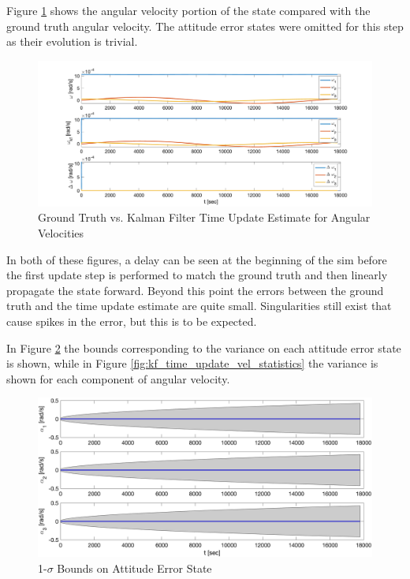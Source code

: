Figure \ref{fig:kf_omega_prop} shows the angular velocity portion of the state compared with the ground truth angular velocity. The attitude error states were omitted for this step as their evolution is trivial.

\begin{figure}[H]
    \centering
    \captionsetup{ justification = centering}
    \includegraphics[width = 15cm]{Images/PS7/kalman_filter_time_update_error_velocities.png}
    \caption{Ground Truth vs. Kalman Filter Time Update Estimate for Angular Velocities}
    \label{fig:kf_omega_prop}
\end{figure}

In both of these figures, a delay can be seen at the beginning of the sim before the first update step is performed to match the ground truth and then linearly propagate the state forward. Beyond this point the errors between the ground truth and the time update estimate are quite small. Singularities still exist that cause spikes in the   error, but this is to be expected.

In Figure \ref{fig:kf_time_update_attitude_statistics} the bounds corresponding to the variance on each attitude error state is shown, while in Figure \ref{fig:kf_time_update_vel_statistics} the variance is shown for each component of angular velocity.

\begin{figure}[H]
    \centering
    \captionsetup{ justification = centering}
    \includegraphics[width = 15cm]{Images/PS7/kalman_filter_att_cov_bounds.png}
    \caption{1-$\sigma$ Bounds on Attitude Error State}
    \label{fig:kf_time_update_attitude_statistics}
\end{figure}

